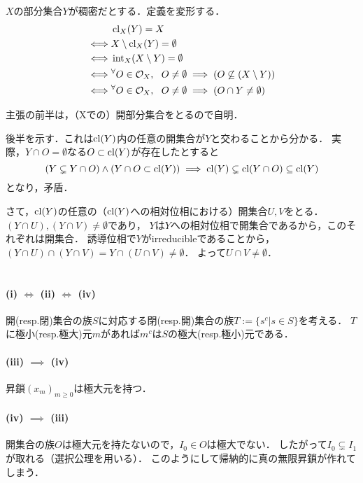 \documentclass[a4paper]{jsarticle}
\begin{document}
    $X$の部分集合$Y$が稠密だとする．定義を変形する．
    \begin{align*}
        {}&     \operatorname{cl}_{X}(Y)=X \\
        \iff&   X \setminus \operatorname{cl}_{X}(Y)=\emptyset \\
        \iff&   \operatorname{int}_{X}(X \setminus Y)=\emptyset \\
        \iff&   {}^{\forall} O \in \mathcal{O}_{X},~~ O \neq \emptyset \implies (O \not \subseteq (X \setminus Y)) \\
        \iff&   {}^{\forall} O \in \mathcal{O}_{X},~~ O \neq \emptyset \implies (O \cap Y \neq \emptyset)
    \end{align*}

    主張の前半は，（Xでの）開部分集合をとるので自明．

    後半を示す．これは$\operatorname{cl}(Y)$内の任意の開集合が$Y$と交わることから分かる．
    実際，$Y \cap O=\emptyset$なる$O \subset \operatorname{cl}(Y)$が存在したとすると
    \[ (Y \subsetneq Y \cap O) \land (Y \cap O \subset \operatorname{cl}(Y)) \implies \operatorname{cl}(Y) \subsetneq \operatorname{cl}(Y \cap O) \subseteq \operatorname{cl}(Y)\]
    となり，矛盾．

    さて，$\operatorname{cl}(Y)$の任意の（$\operatorname{cl}(Y)$への相対位相における）開集合$U, V$をとる．
    $(Y \cap U),(Y \cap V) \neq \emptyset$であり，
    $Y$は$Y$への相対位相で開集合であるから，このそれぞれは開集合．
    誘導位相で$Y$がirreducibleであることから，
    $(Y \cap U) \cap (Y \cap V)=Y \cap (U \cap V) \neq \emptyset$．
    よって$U \cap V \neq \emptyset$．

\section{}
\subsection{}
    \paragraph{(i) $\iff$ (ii) $\iff$ (iv)}
    開(resp.閉)集合の族$S$に対応する閉(resp.開)集合の族$T:=\{ s^c | s \in S \}$を考える．
    $T$に極小(resp.極大)元$m$があれば$m^c$は$S$の極大(resp.極小)元である．

    \paragraph{(iii) $\implies$ (iv)}
    昇鎖$(x_m)_{m \geq 0}$は極大元を持つ．

    \paragraph{(iv) $\implies$ (iii)}
    開集合の族$O$は極大元を持たないので，$I_0 \in O$は極大でない．
    したがって$I_0 \subsetneq I_1$が取れる（選択公理を用いる）．
    このようにして帰納的に真の無限昇鎖が作れてしまう．
\end{document}
